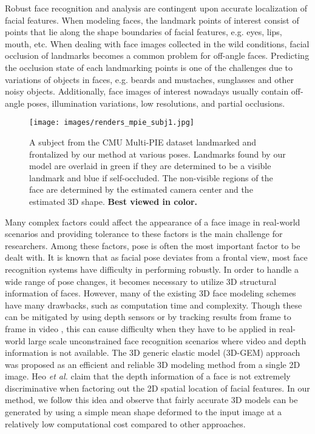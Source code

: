 \documentclass[10pt,twocolumn,letterpaper]{article}
\begin{document}
Robust face recognition and analysis are contingent upon accurate localization of facial features.  When modeling faces, the landmark points of interest consist of points that lie along the shape boundaries of facial features, e.g. eyes, lips, mouth, etc. When dealing with face images collected in the wild conditions, facial occlusion of landmarks becomes a common problem for off-angle faces.
Predicting the occlusion state of each landmarking points is one of the challenges due to variations of objects in faces, e.g. beards and mustaches, sunglasses and other noisy objects. Additionally, face images of interest nowadays usually contain off-angle poses, illumination variations, low resolutions, and partial occlusions. 

\begin{figure}[t!]
\centering
\texttt{[image: images/renders\_mpie\_subj1.jpg]}
\caption{A subject from the CMU Multi-PIE dataset \cite{mpie1,mpie2} landmarked and frontalized by our method at various poses. Landmarks found by our model are overlaid in green if they are determined to be a visible landmark and blue if self-occluded. The non-visible regions of the face are determined by the estimated camera center and the estimated 3D shape. \textbf{Best viewed in color.}}
\label{fig:frontalization}
\end{figure}

Many complex factors could affect the appearance of a face image in real-world scenarios and providing tolerance to these factors is the main challenge for researchers. Among these factors, pose is often the most important factor to be dealt with. It is known that as facial pose deviates from a frontal view, most face recognition systems have difficulty in performing robustly. In order to handle a wide range of pose changes, it becomes necessary to utilize 3D structural information of faces. However, many of the existing 3D face modeling schemes ~\cite{Atick96,Blanz02,Wang06} have many drawbacks, such as computation time and complexity. Though these can be mitigated by using depth sensors \cite{Hsieh2015} or by tracking results from frame to frame in video \cite{Saito2016}, this can cause difficulty when they have to be applied in real-world large scale unconstrained face recognition scenarios where video and depth information is not available. The 3D generic elastic model (3D-GEM) approach was proposed as an efficient and reliable 3D modeling method from a single 2D image. Heo \emph{et al.} \cite{jheo_gem_2009,GEM_2011} claim that the depth information of a face is not extremely discriminative when factoring out the 2D spatial location of facial features. In our method, we follow this idea and observe that fairly accurate 3D models can be generated by using a simple mean shape deformed to the input image at a relatively low computational cost compared to other approaches.
\end{document}
